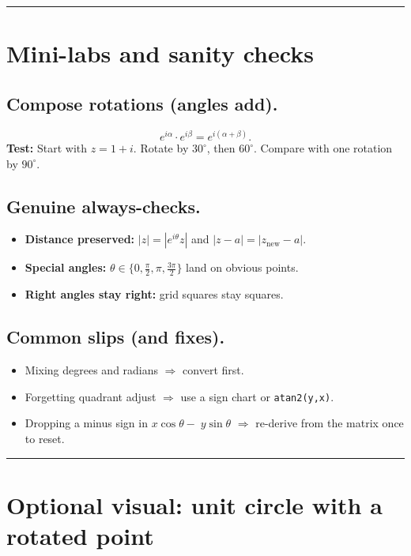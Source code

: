 \documentclass[11pt]{article}
\begin{document}
\bigskip
\hrule
\bigskip

\section*{Mini-labs and sanity checks}
\subsection*{Compose rotations (angles add).}
\[
e^{i\alpha}\cdot e^{i\beta}=e^{i(\alpha+\beta)}.
\]
\textbf{Test:} Start with \(z=1+i\). Rotate by \(30^\circ\), then \(60^\circ\). Compare with one rotation by \(90^\circ\).

\subsection*{Genuine always-checks.}
\begin{itemize}
  \item \textbf{Distance preserved:} \(|z|=|e^{i\theta}z|\) and \(|z-a|=|z_{\text{new}}-a|\).
  \item \textbf{Special angles:} \(\theta\in\{0,\tfrac{\pi}{2},\pi,\tfrac{3\pi}{2}\}\) land on obvious points.
  \item \textbf{Right angles stay right:} grid squares stay squares.
\end{itemize}

\subsection*{Common slips (and fixes).}
\begin{itemize}
  \item Mixing degrees and radians \(\Rightarrow\) convert first.
  \item Forgetting quadrant adjust \(\Rightarrow\) use a sign chart or \texttt{atan2(y,x)}.
  \item Dropping a minus sign in \(x\cos\theta-\;y\sin\theta\) \(\Rightarrow\) re-derive from the matrix once to reset.
\end{itemize}

\bigskip
\hrule
\bigskip

\section*{Optional visual: unit circle with a rotated point}
\begin{center}
\end{center}
\end{document}
